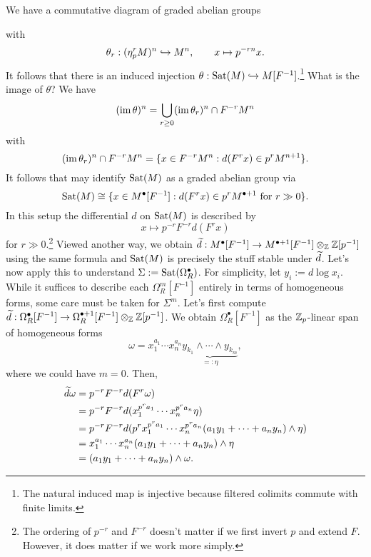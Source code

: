 \documentclass[11pt]{article}
\newcommand{\Sat}{\textup{Sat}} %
\begin{document}
We have a commutative diagram of graded abelian groups
\begin{center}
\end{center}
with
$$\theta_r: (\eta_p^rM)^n\hookrightarrow M^n,\qquad x\mapsto p^{-rn}x.$$
It follows that there is an induced injection $\theta: \Sat(M)\inj M[F^{-1}]$.\footnote{The natural induced map is injective because filtered colimits commute with finite limits.} What is the image of $\theta$? We have 
$$(\operatorname{im}\theta)^n=\bigcup_{r\geq0}(\operatorname{im}\theta_r)^n\cap F^{-r}M^n$$
with
$$(\operatorname{im}\theta_r)^n\cap F^{-r}M^n=\{x\in F^{-r}M^n : d(F^rx)\in p^rM^{n+1}\}.$$
It follows that may identify $\Sat(M)$ as a graded abelian group via
$$\Sat(M)\iso\{x\in M^{\bullet}[F^{-1}] : d(F^rx)\in p^rM^{\bullet+1}\textrm{ for }r\gg0\}.$$
In this setup the differential $d$ on $\Sat(M)$ is described by
$$x\mapsto p^{-r}F^{-r}d(F^rx)$$
for $r\gg0$.\footnote{The ordering of $p^{-r}$ and $F^{-r}$ doesn't matter if we first invert $p$ and extend $F$. However, it does matter if we work more simply.} Viewed another way, we obtain $\widetilde{d}: M^{\bullet}[F^{-1}]\to M^{\bullet+1}[F^{-1}]\otimes_{\mathbb{Z}}\mathbb{Z}[p^{-1}]$ using the same formula and $\Sat(M)$ is precisely the stuff stable under $\widetilde{d}$. Let's now apply this to understand $\Sigma:=\Sat(\Omega_R^{\bullet})$. For simplicity, let $y_i:=d\log x_i$. While it suffices to describe each $\Omega_R^m[F^{-1}]$ entirely in terms of homogeneous forms, some care must be taken for $\Sigma^m$. Let's first compute $\widetilde{d}: \Omega_R^{\bullet}[F^{-1}]\to\Omega_R^{\bullet+1}[F^{-1}]\otimes_{\mathbb{Z}}\mathbb{Z}[p^{-1}]$. We obtain $\Omega_R^{\bullet}[F^{-1}]$ as the $\mathbb{Z}_p$-linear span of homogeneous forms
$$\omega=x_1^{a_1}\cdots x_n^{a_n}\underbrace{y_{k_1}\wedge\cdots\wedge y_{k_m}}_{=:\eta},$$ 
where we could have $m=0$. Then,
\begin{align*}
\widetilde{d}\omega
&=p^{-r}F^{-r}d(F^r\omega) \\
&=p^{-r}F^{-r}d(x_1^{p^ra_1}\cdots x_n^{p^ra_n}\eta) \\
&=p^{-r}F^{-r}d(p^rx_1^{p^ra_1}\cdots x_n^{p^ra_n}(a_1y_1+\cdots+a_ny_n)\wedge\eta) \\
&=x_1^{a_1}\cdots x_n^{a_n}(a_1y_1+\cdots+a_ny_n)\wedge\eta \\
&=(a_1y_1+\cdots+a_ny_n)\wedge\omega.
\end{align*}
\end{document}
